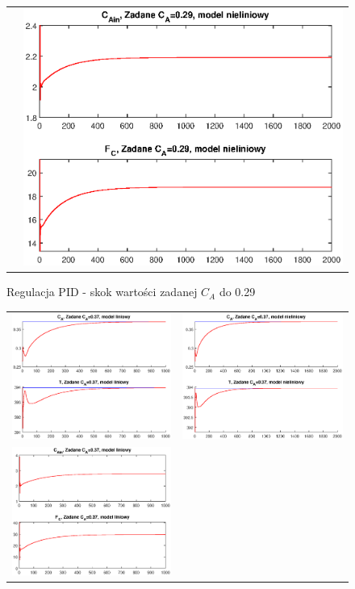 \begin{figure}
\begin{tabular}{cc}
		&
		\includegraphics[width=.5\linewidth]{img/pidnlin/pidnlin1.eps}
	\end{tabular}
\label{ch2:pid1}
\caption{Regulacja PID - skok wartości zadanej $C_A$ do 0.29}
\end{figure}
\newpage
\begin{figure}
\begin{tabular}{cc}
	\includegraphics[width=.5\linewidth]{img/pidlin/pidlin4.eps}
	&
	\includegraphics[width=.5\linewidth]{img/pidnlin/pidnlin4.eps}
	\\
	\includegraphics[width=.5\linewidth]{img/pidlin/pidlin3.eps}

\end{tabular}
\end{figure}
